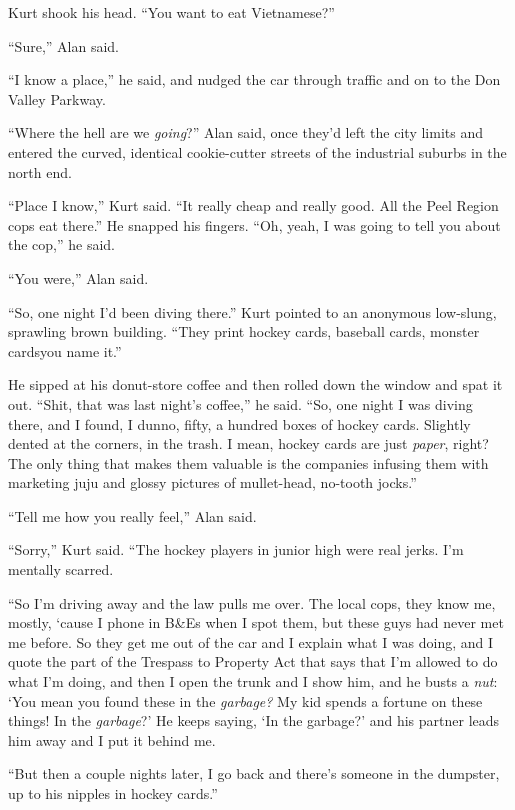 Kurt shook his head.  ``You want to eat Vietnamese?''

``Sure,'' Alan said.

``I know a place,'' he said, and nudged the car through traffic and on
to the Don Valley Parkway.

``Where the hell are we \textit{going}?'' Alan said, once they'd left
the city limits and entered the curved, identical cookie-cutter
streets of the industrial suburbs in the north end.

``Place I know,'' Kurt said.  ``It really cheap and really good.  All
the Peel Region cops eat there.'' He snapped his fingers.  ``Oh, yeah,
I was going to tell you about the cop,'' he said.

``You were,'' Alan said.

``So, one night I'd been diving there.'' Kurt pointed to an anonymous
low-slung, sprawling brown building.  ``They print hockey cards,
baseball cards, monster cards\dash{}you name it.''

He sipped at his donut-store coffee and then rolled down the window
and spat it out.  ``Shit, that was last night's coffee,'' he said. 
``So, one night I was diving there, and I found, I dunno, fifty, a
hundred boxes of hockey cards.  Slightly dented at the corners, in the
trash.  I mean, hockey cards are just \textit{paper}, right?  The only
thing that makes them valuable is the companies infusing them with
marketing juju and glossy pictures of mullet-head, no-tooth jocks.''

``Tell me how you really feel,'' Alan said.

``Sorry,'' Kurt said.  ``The hockey players in junior high were real
jerks.  I'm mentally scarred.

``So I'm driving away and the law pulls me over.  The local cops, they
know me, mostly, `cause I phone in B\&Es when I spot them, but
these guys had never met me before.  So they get me out of the car and
I explain what I was doing, and I quote the part of the Trespass to
Property Act that says that I'm allowed to do what I'm doing, and then
I open the trunk and I show him, and he busts a \textit{nut}:  `You
mean you found these in the \textit{garbage?} My kid spends a fortune
on these things!  In the \textit{garbage}?' He keeps saying, `In the
garbage?' and his partner leads him away and I put it behind me.

``But then a couple nights later, I go back and there's someone in the
dumpster, up to his nipples in hockey cards.''

